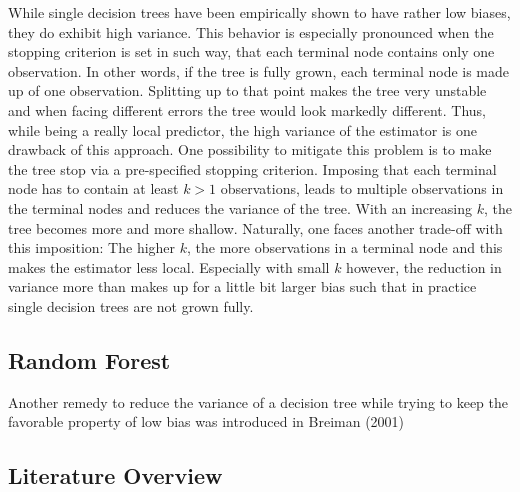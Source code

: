 {While single decision trees have been empirically shown to have rather low biases, they do exhibit high variance. This behavior is especially pronounced when the stopping criterion is set in such way, that each terminal node contains only one observation. In other words, if the tree is fully grown, each terminal node is made up of one observation. Splitting up to that point makes the tree very unstable and when facing different errors the tree would look markedly different. Thus, while being a really local predictor, the high variance of the estimator is one drawback of this approach. One possibility to mitigate this problem is to make the tree stop via a pre-specified stopping criterion. Imposing that each terminal node has to contain at least $k > 1$ observations, leads to multiple observations in the terminal nodes and reduces the variance of the tree. With an increasing $k$, the tree becomes more and more shallow. Naturally, one faces another trade-off with this imposition: The higher $k$, the more observations in a terminal node and this makes the estimator less local. Especially with small $k$ however, the reduction in variance more than makes up for a little bit larger bias such that in practice single decision trees are not grown fully.


\subsection{Random Forest}

Another remedy to reduce the variance of a decision tree while trying to keep the favorable property of low bias was introduced in Breiman (2001) 
 
\subsection{Literature Overview}

}
